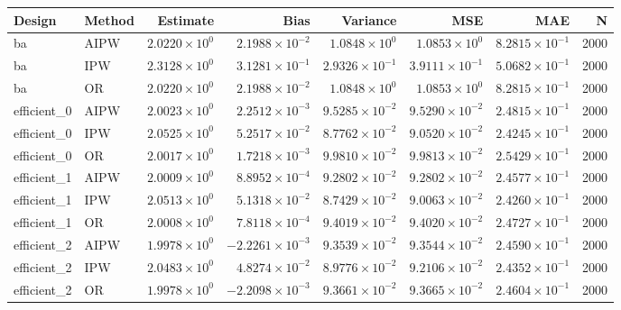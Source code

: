 \begin{table}[ht]
\centering
\begin{tabular}{llrrrrrr}
  \toprule
Design & Method & Estimate & Bias & Variance & MSE & MAE & N \\ 
  \midrule
ba & AIPW & $2.0220 \times 10^{0}$ & $2.1988 \times 10^{-2}$ & $1.0848 \times 10^{0}$ & $1.0853 \times 10^{0}$ & $8.2815 \times 10^{-1}$ & 2000 \\ 
  ba & IPW & $2.3128 \times 10^{0}$ & $3.1281 \times 10^{-1}$ & $2.9326 \times 10^{-1}$ & $3.9111 \times 10^{-1}$ & $5.0682 \times 10^{-1}$ & 2000 \\ 
  ba & OR & $2.0220 \times 10^{0}$ & $2.1988 \times 10^{-2}$ & $1.0848 \times 10^{0}$ & $1.0853 \times 10^{0}$ & $8.2815 \times 10^{-1}$ & 2000 \\ 
   \midrule
efficient\_0 & AIPW & $2.0023 \times 10^{0}$ & $2.2512 \times 10^{-3}$ & $9.5285 \times 10^{-2}$ & $9.5290 \times 10^{-2}$ & $2.4815 \times 10^{-1}$ & 2000 \\ 
  efficient\_0 & IPW & $2.0525 \times 10^{0}$ & $5.2517 \times 10^{-2}$ & $8.7762 \times 10^{-2}$ & $9.0520 \times 10^{-2}$ & $2.4245 \times 10^{-1}$ & 2000 \\ 
  efficient\_0 & OR & $2.0017 \times 10^{0}$ & $1.7218 \times 10^{-3}$ & $9.9810 \times 10^{-2}$ & $9.9813 \times 10^{-2}$ & $2.5429 \times 10^{-1}$ & 2000 \\ 
   \midrule
efficient\_1 & AIPW & $2.0009 \times 10^{0}$ & $8.8952 \times 10^{-4}$ & $9.2802 \times 10^{-2}$ & $9.2802 \times 10^{-2}$ & $2.4577 \times 10^{-1}$ & 2000 \\ 
  efficient\_1 & IPW & $2.0513 \times 10^{0}$ & $5.1318 \times 10^{-2}$ & $8.7429 \times 10^{-2}$ & $9.0063 \times 10^{-2}$ & $2.4260 \times 10^{-1}$ & 2000 \\ 
  efficient\_1 & OR & $2.0008 \times 10^{0}$ & $7.8118 \times 10^{-4}$ & $9.4019 \times 10^{-2}$ & $9.4020 \times 10^{-2}$ & $2.4727 \times 10^{-1}$ & 2000 \\ 
   \midrule
efficient\_2 & AIPW & $1.9978 \times 10^{0}$ & $-2.2261 \times 10^{-3}$ & $9.3539 \times 10^{-2}$ & $9.3544 \times 10^{-2}$ & $2.4590 \times 10^{-1}$ & 2000 \\ 
  efficient\_2 & IPW & $2.0483 \times 10^{0}$ & $4.8274 \times 10^{-2}$ & $8.9776 \times 10^{-2}$ & $9.2106 \times 10^{-2}$ & $2.4352 \times 10^{-1}$ & 2000 \\ 
  efficient\_2 & OR & $1.9978 \times 10^{0}$ & $-2.2098 \times 10^{-3}$ & $9.3661 \times 10^{-2}$ & $9.3665 \times 10^{-2}$ & $2.4604 \times 10^{-1}$ & 2000 \\ 

\end{tabular}
\end{table}
